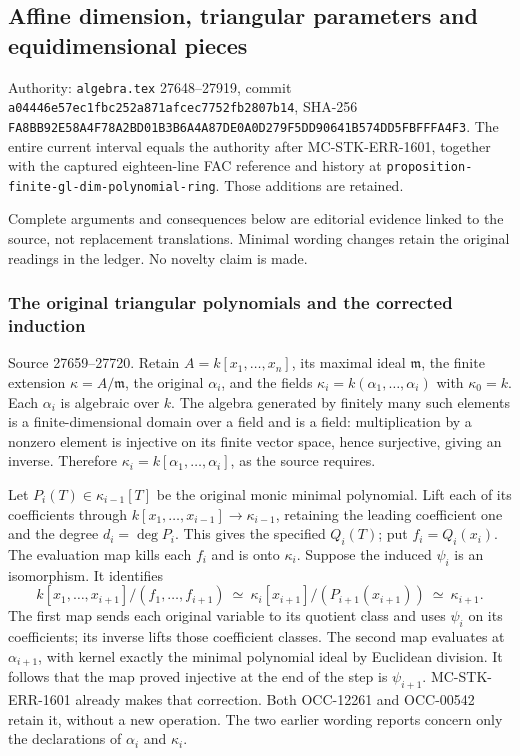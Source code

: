 \subsection{Affine dimension, triangular parameters and equidimensional pieces}\label{affine-dimension-triangular-parameters-and-equidimensional-pieces}

Authority: \texttt{algebra.tex} 27648--27919, commit \texttt{a04446e57ec1fbc252a871afcec7752fb2807b14}, SHA-256 \texttt{FA8BB92E58A4F78A2BD01B3B6A4A87DE0A0D279F5DD90641B574DD5FBFFFA4F3}. The entire current interval equals the authority after MC-STK-ERR-1601, together with the captured eighteen-line FAC reference and history at \texttt{proposition-finite-gl-dim-polynomial-ring}. Those additions are retained.

Complete arguments and consequences below are editorial evidence linked to the source, not replacement translations. Minimal wording changes retain the original readings in the ledger. No novelty claim is made.

\subsubsection{The original triangular polynomials and the corrected induction}\label{the-original-triangular-polynomials-and-the-corrected-induction}

Source 27659--27720. Retain \(A=k[x_1,\ldots,x_n]\), its maximal ideal \(\mathfrak m\), the finite extension \(\kappa=A/\mathfrak m\), the original \(\alpha_i\), and the fields \(\kappa_i=k(\alpha_1,\ldots,\alpha_i)\) with \(\kappa_0=k\). Each \(\alpha_i\) is algebraic over \(k\). The algebra generated by finitely many such elements is a finite-dimensional domain over a field and is a field: multiplication by a nonzero element is injective on its finite vector space, hence surjective, giving an inverse. Therefore \(\kappa_i=k[\alpha_1,\ldots,\alpha_i]\), as the source requires.

Let \(P_i(T)\in\kappa_{i-1}[T]\) be the original monic minimal polynomial. Lift each of its coefficients through \(k[x_1,\ldots,x_{i-1}]\to\kappa_{i-1}\), retaining the leading coefficient one and the degree \(d_i=\deg P_i\). This gives the specified \(Q_i(T)\); put \(f_i=Q_i(x_i)\). The evaluation map kills each \(f_i\) and is onto \(\kappa_i\). Suppose the induced \(\psi_i\) is an isomorphism. It identifies \[
 k[x_1,\ldots,x_{i+1}]/(f_1,\ldots,f_{i+1})
 \ \simeq\ \kappa_i[x_{i+1}]/(P_{i+1}(x_{i+1}))
 \ \simeq\ \kappa_{i+1}.
\] The first map sends each original variable to its quotient class and uses \(\psi_i\) on its coefficients; its inverse lifts those coefficient classes. The second map evaluates at \(\alpha_{i+1}\), with kernel exactly the minimal polynomial ideal by Euclidean division. It follows that the map proved injective at the end of the step is \(\psi_{i+1}\). MC-STK-ERR-1601 already makes that correction. Both OCC-12261 and OCC-00542 retain it, without a new operation. The two earlier wording reports concern only the declarations of \(\alpha_i\) and \(\kappa_i\).

